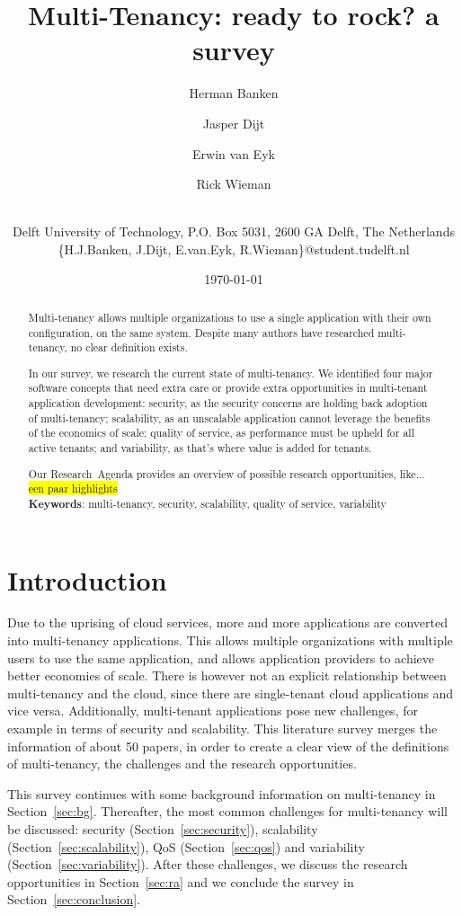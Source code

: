 \documentclass{article}
\title{Multi-Tenancy: ready to rock? a survey}
\author{Herman Banken\and
    Jasper Dijt\and
    Erwin van Eyk\and
    Rick Wieman\and
\\Delft University of Technology, P.O. Box 5031, 2600 GA Delft, The Netherlands
\\\{H.J.Banken, J.Dijt, E.van.Eyk, R.Wieman\}@student.tudelft.nl
}
\date{\today}
\newcommand{\highlight}[1]{\colorbox{yellow}{#1}}
\begin{document}
\maketitle
\thispagestyle{empty}

\begin{abstract}
Multi-tenancy allows multiple organizations to use a single application with their own configuration, on the same system. Despite many authors have researched multi-tenancy, no clear definition exists.

In our survey, we research the current state of multi-tenancy. We identified four major software concepts that need extra care or provide extra opportunities in multi-tenant application development: 
security, as the security concerns are holding back adoption of multi-tenancy; 
scalability, as an unscalable application cannot leverage the benefits of the economics of scale; 
quality of service, as performance must be upheld for all active tenants;
and variability, as that's where value is added for tenants.  

Our Research~Agenda provides an overview of possible research opportunities, 
like... \highlight{een paar highlights}%
\\

\textbf{Keywords}: multi-tenancy, security, scalability, quality of service, variability
\end{abstract}

\section{Introduction}
Due to the uprising of cloud services, more and more applications are converted into multi-tenancy applications. 
This allows multiple organizations with multiple users to use the same application, and allows application providers to achieve better economies of scale. 
There is however not an explicit relationship between multi-tenancy and the cloud, since there are single-tenant cloud applications and vice versa. 
Additionally, multi-tenant applications pose new challenges, for example in terms of security and scalability. 
This literature survey merges the information of about 50 papers, in order to create a clear view of the definitions of multi-tenancy, the challenges and the research opportunities.

This survey continues with some background information on multi-tenancy in Section~\ref{sec:bg}. Thereafter, the most common challenges for multi-tenancy will be discussed: security (Section~\ref{sec:security}), scalability (Section~\ref{sec:scalability}), \ac{QoS} (Section~\ref{sec:qos}) and variability (Section~\ref{sec:variability}). After these challenges, we discuss the research opportunities in Section~\ref{sec:ra} and we conclude the survey in Section~\ref{sec:conclusion}. %
\end{document}
